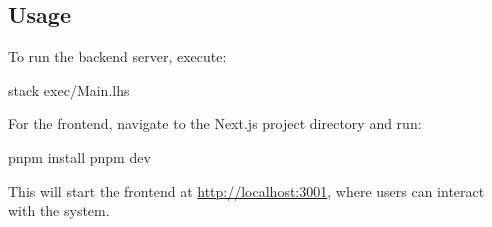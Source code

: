 \subsection{Usage}
To run the backend server, execute:
\begin{code}
stack exec/Main.lhs
\end{code}
	
For the frontend, navigate to the Next.js project directory and run:
\begin{code}
pnpm install
pnpm dev
\end{code}
	
This will start the frontend at \url{http://localhost:3001}, where users can interact with the system.